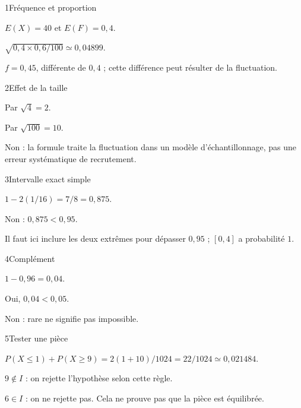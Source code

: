 \begin{corrige}{1}{Fréquence et proportion}
\begin{questions}
\item $E(X)=40$ et $E(F)=0{,}4$.
\item $\sqrt{0{,}4\times0{,}6/100}\simeq0{,}04899$.
\item $f=0{,}45$, différente de $0{,}4$ ; cette différence peut résulter de la fluctuation.
\end{questions}
\end{corrige}
\begin{corrige}{2}{Effet de la taille}
\begin{questions}
\item Par $\sqrt4=2$.
\item Par $\sqrt{100}=10$.
\item Non : la formule traite la fluctuation dans un modèle d’échantillonnage, pas une erreur systématique de recrutement.
\end{questions}
\end{corrige}
\begin{corrige}{3}{Intervalle exact simple}
\begin{questions}
\item $1-2(1/16)=7/8=0{,}875$.
\item Non : $0{,}875<0{,}95$.
\item Il faut ici inclure les deux extrêmes pour dépasser $0{,}95$ ; $[0,4]$ a probabilité $1$.
\end{questions}
\end{corrige}
\begin{corrige}{4}{Complément}
\begin{questions}
\item $1-0{,}96=0{,}04$.
\item Oui, $0{,}04<0{,}05$.
\item Non : rare ne signifie pas impossible.
\end{questions}
\end{corrige}
\begin{corrige}{5}{Tester une pièce}
\begin{questions}
\item $P(X\leq1)+P(X\geq9)=2(1+10)/1024=22/1024\simeq0{,}021484$.
\item $9\notin I$ : on rejette l’hypothèse selon cette règle.
\item $6\in I$ : on ne rejette pas. Cela ne prouve pas que la pièce est équilibrée.
\end{questions}
\end{corrige}
